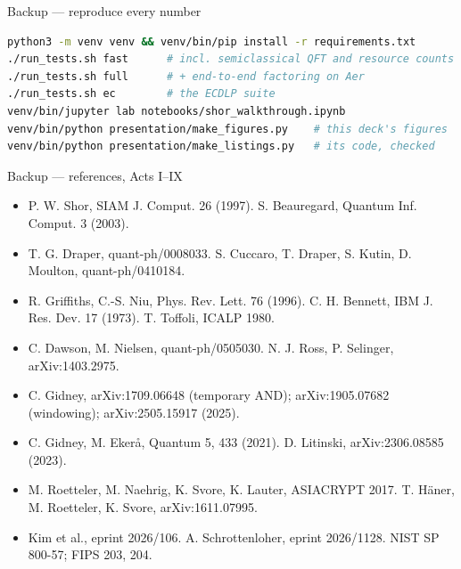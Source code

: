 \documentclass[aspectratio=169,11pt]{beamer}
\begin{document}
\begin{frame}[fragile]{Backup --- reproduce every number}
\begin{lstlisting}[language=bash,basicstyle=\ttfamily\small,morekeywords={}]
python3 -m venv venv && venv/bin/pip install -r requirements.txt
./run_tests.sh fast      # incl. semiclassical QFT and resource counts
./run_tests.sh full      # + end-to-end factoring on Aer
./run_tests.sh ec        # the ECDLP suite
venv/bin/jupyter lab notebooks/shor_walkthrough.ipynb
venv/bin/python presentation/make_figures.py    # this deck's figures
venv/bin/python presentation/make_listings.py   # its code, checked
\end{lstlisting}
\end{frame}

\begin{frame}{Backup --- references, Acts I--IX}
  \footnotesize
  \begin{itemize}\setlength{\itemsep}{1.2mm}
    \item P. W. Shor, SIAM J. Comput. 26 (1997). \quad S. Beauregard, Quantum Inf. Comput. 3 (2003).
    \item T. G. Draper, quant-ph/0008033. \quad S. Cuccaro, T. Draper, S. Kutin, D. Moulton, quant-ph/0410184.
    \item R. Griffiths, C.-S. Niu, Phys. Rev. Lett. 76 (1996). \quad C. H. Bennett, IBM J. Res. Dev. 17 (1973). \quad T. Toffoli, ICALP 1980.
    \item C. Dawson, M. Nielsen, quant-ph/0505030. \quad N. J. Ross, P. Selinger, arXiv:1403.2975.
    \item C. Gidney, arXiv:1709.06648 (temporary AND); arXiv:1905.07682 (windowing); arXiv:2505.15917 (2025).
    \item C. Gidney, M. Ekerå, Quantum 5, 433 (2021). \quad D. Litinski, arXiv:2306.08585 (2023).
    \item M. Roetteler, M. Naehrig, K. Svore, K. Lauter, ASIACRYPT 2017. \quad T. Häner, M. Roetteler, K. Svore, arXiv:1611.07995.
    \item Kim et al., eprint 2026/106. \quad A. Schrottenloher, eprint 2026/1128. \quad NIST SP 800-57; FIPS 203, 204.
  \end{itemize}
\end{frame}
\end{document}
